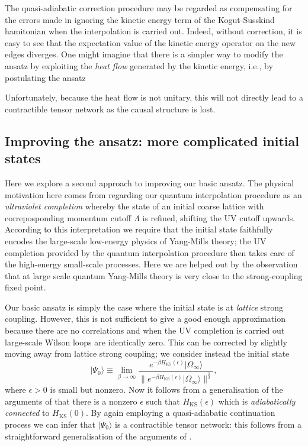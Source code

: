 \documentclass[twocolumn,lengthcheck,superscriptaddress]{revtex4-1}
\theoremstyle{definition}
\theoremstyle{remark}
\begin{document}
The quasi-adiabatic correction procedure may be regarded as compensating for the errors made in ignoring the kinetic energy term of the Kogut-Susskind hamitonian when the interpolation is carried out. Indeed, without correction, it is easy to see that the expectation value of the kinetic energy operator on the new edges diverges. One might imagine that there is a simpler way to modify the ansatz by exploiting the \emph{heat flow} generated by the kinetic energy, i.e., by postulating the ansatz

Unfortunately, because the heat flow is not unitary, this will not directly lead to a contractible tensor network as the causal structure is lost. 

\subsection{Improving the ansatz: more complicated initial states}
Here we explore a second approach to improving our basic ansatz. The physical motivation here comes from regarding our quantum interpolation procedure as an \emph{ultraviolet completion} whereby the state of an initial coarse lattice with correposponding momentum cutoff $\Lambda$ is refined, shifting the UV cutoff upwards. According to this interpretation we require that the initial state faithfully encodes the large-scale low-energy physics of Yang-Mills theory; the UV completion provided by the quantum interpolation procedure then takes care of the high-energy small-scale processes. Here we are helped out by the observation that at large scale quantum Yang-Mills theory is very close to the strong-coupling fixed point. 

Our basic ansatz is simply the case where the initial state is at \emph{lattice} strong coupling. However, this is not sufficient to give a good enough approximation because there are no correlations and when the UV completion is carried out large-scale Wilson loops are identically zero. This can be corrected by slightly moving away from lattice strong coupling; we consider instead the initial state
\begin{equation}
	|\Psi_0\rangle \equiv \lim_{\beta\rightarrow\infty} \frac{e^{-\beta H_{\text{KS}}(\epsilon)}|\Omega_\infty\rangle}{\|e^{-\beta H_{\text{KS}}(\epsilon)}|\Omega_\infty\rangle\|^{\frac12}},
\end{equation}    
where $\epsilon > 0$ is small but nonzero. Now it follows from a generalisation of the arguments of \cite{bravyi:2010c,michalakis:2013a} that there is a nonzero $\epsilon$ such that $H_{\text{KS}}(\epsilon)$ which is \emph{adiabatically connected} to $H_{\text{KS}}(0)$. By again employing a quasi-adiabatic continuation process we can infer that $|\Psi_0\rangle$ is a contractible tensor network: this follows from a straightforward generalisation of the arguments of \cite{osborne:2006a,wen:2005a}. 
\end{document}
